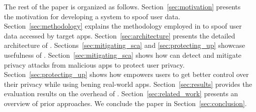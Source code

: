 The rest of the paper is organized as follows. Section~\ref{sec:motivation} presents the motivation for developing a system to spoof user data. Section~\ref{sec:methodology} explains the methodology employed in \framework{} to spoof user data accessed by target apps. Section~\ref{sec:architecture} presents the detailed architecture of \framework{}. Sections~\ref{sec:mitigating_sca} and \ref{sec:protecting_up} showcase usefulness of \framework{}. Section~\ref{sec:mitigating_sca} shows how \framework{} can detect and mitigate privacy attacks from malicious apps to protect user privacy. Section~\ref{sec:protecting_up} shows how \framework{} empowers users to get better control over their privacy while using bening real-world apps. Section~\ref{sec:results} provides the evaluation results on the overhead of \framework{}. Section~\ref{sec:related_work} presents an overview of prior approaches. We conclude the paper in Section~\ref{sec:conclusion}.